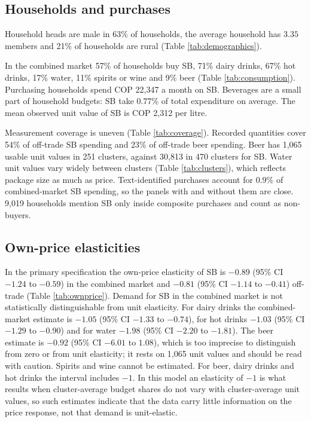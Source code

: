 \documentclass[
  11pt,
]{article}
\begin{document}
\subsection{Households and purchases}\label{households-and-purchases}

Household heads are male in 63\% of households, the average household
has \(3.35\) members and 21\% of households are rural (Table
\ref{tab:demographics}).

In the combined market 57\% of households buy SB, 71\% dairy drinks,
67\% hot drinks, 17\% water, 11\% spirits or wine and 9\% beer (Table
\ref{tab:consumption}). Purchasing households spend COP 22,347 a month
on SB. Beverages are a small part of household budgets: SB take
\(0.77\)\% of total expenditure on average. The mean observed unit value
of SB is COP 2,312 per litre.

Measurement coverage is uneven (Table \ref{tab:coverage}). Recorded
quantities cover 54\% of off-trade SB spending and 23\% of off-trade
beer spending. Beer has 1,065 usable unit values in 251 clusters,
against 30,813 in 470 clusters for SB. Water unit values vary widely
between clusters (Table \ref{tab:clusters}), which reflects package size
as much as price. Text-identified purchases account for 0.9\% of
combined-market SB spending, so the panels with and without them are
close. 9,019 households mention SB only inside composite purchases and
count as non-buyers.

\subsection{Own-price elasticities}\label{own-price-elasticities}

In the primary specification the own-price elasticity of SB is \(-0.89\)
(95\% CI \(-1.24\) to \(-0.59\)) in the combined market and \(-0.81\)
(95\% CI \(-1.14\) to \(-0.41\)) off-trade (Table \ref{tab:ownprice}).
Demand for SB in the combined market is not statistically
distinguishable from unit elasticity. For dairy drinks the
combined-market estimate is \(-1.05\) (95\% CI \(-1.33\) to \(-0.74\)),
for hot drinks \(-1.03\) (95\% CI \(-1.29\) to \(-0.90\)) and for water
\(-1.98\) (95\% CI \(-2.20\) to \(-1.81\)). The beer estimate is
\(-0.92\) (95\% CI \(-6.01\) to \(1.08\)), which is too imprecise to
distinguish from zero or from unit elasticity; it rests on 1,065 unit
values and should be read with caution. Spirits and wine cannot be
estimated. For beer, dairy drinks and hot drinks the interval includes
\(-1\). In this model an elasticity of \(-1\) is what results when
cluster-average budget shares do not vary with cluster-average unit
values, so such estimates indicate that the data carry little
information on the price response, not that demand is unit-elastic.
\end{document}
